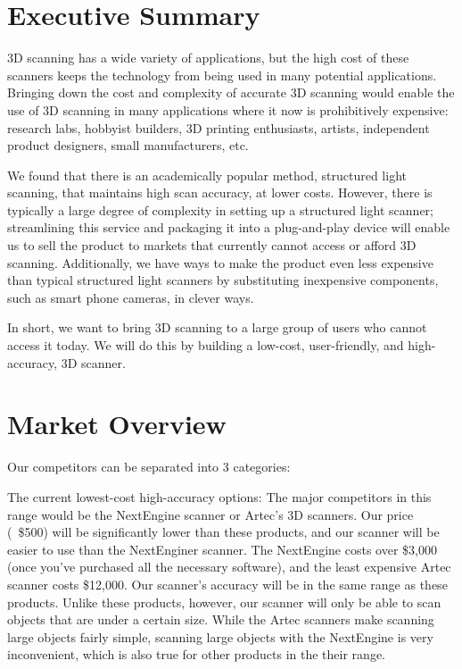 \documentclass{article}
\begin{document}
\section{Executive Summary}
3D scanning has a wide variety of applications, but the high cost of these
scanners keeps the technology from being used in many potential applications.
Bringing down the cost and complexity of accurate 3D scanning would enable the
use of 3D scanning in many applications where it now is prohibitively expensive:
research labs, hobbyist builders, 3D printing enthusiasts, artists, independent
product designers, small manufacturers, etc.

We found that there is an academically popular method, structured light
scanning, that maintains high scan accuracy, at lower costs. However, there is
typically a large degree of complexity in setting up a structured light scanner;
streamlining this service and packaging it into a plug-and-play device will
enable us to sell the product to markets that currently cannot access or afford
3D scanning. Additionally, we have ways to make the product even less expensive
than typical structured light scanners by substituting inexpensive components,
such as smart phone cameras, in clever ways.

In short, we want to bring 3D scanning to a large group of users who cannot
access it today. We will do this by building a low-cost, user-friendly, and
high-accuracy, 3D scanner.

\section{Market Overview}
Our competitors can be separated into 3 categories:

The current lowest-cost high-accuracy options: The major competitors in this
range would be the NextEngine scanner or Artec's 3D scanners. Our price (~\$500)
will be significantly lower than these products, and our scanner will be easier
to use than the NextEnginer scanner. The NextEngine costs over \$3,000 (once
you've purchased all the necessary software), and the least expensive Artec
scanner costs \$12,000. Our scanner's accuracy will be in the same range as
these products. Unlike these products, however, our scanner will only be able to
scan objects that are under a certain size. While the Artec scanners make
scanning large objects fairly simple, scanning large objects with the NextEngine
is very inconvenient, which is also true for other products in the their range.
\end{document}
